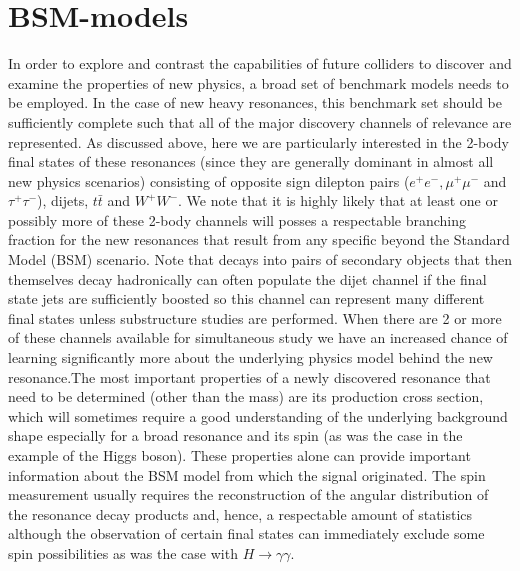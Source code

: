 \section{BSM-models}
\label{sec:physmodel}


In order to explore and contrast the capabilities of future colliders to discover and examine the properties of new physics, a broad set of benchmark models needs to be employed. In the 
case of new heavy resonances, this benchmark set should be sufficiently complete such that all of the major discovery channels of relevance are represented. As discussed above, here we 
are particularly interested in the 2-body final states of these resonances (since they are generally dominant in almost all new physics scenarios) consisting of opposite sign dilepton 
pairs ($e^+e^-, \mu^+\mu^-$ and $\tau^+\tau^-$), dijets, $ t\bar t$ and $W^+W^-$.  We note that it is highly likely that at least one or possibly more of these 2-body channels will posses 
a respectable branching fraction for the new resonances that result from any specific beyond the Standard Model (BSM) scenario. Note that decays into pairs of secondary objects that 
then themselves decay hadronically can often populate the dijet channel if the final state jets are sufficiently boosted so this channel can represent many different final states unless 
substructure studies are performed.  When there are 2 or more of these channels available for simultaneous study we have an increased chance of learning significantly more about 
the underlying physics model behind the new resonance.The most important properties of a newly discovered resonance that need to be determined (other than the mass) are its 
production cross section, which will sometimes require a good understanding of the underlying background shape especially for a broad resonance and its spin (as was the case in 
the example of the Higgs boson). These properties alone can provide important information about the BSM model from which the signal originated. The spin measurement usually requires 
the reconstruction of the angular distribution of the resonance decay products and, hence, a respectable amount of statistics although the observation of certain final states can 
immediately exclude some spin possibilities as was the case with $H\rightarrow \gamma \gamma$.

